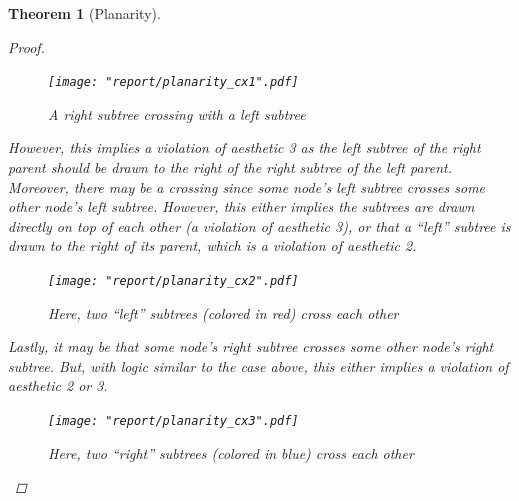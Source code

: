 \documentclass[11pt]{report}
\newtheorem{theorem}{Theorem}[section]
\begin{document}
\begin{theorem}[Planarity]
\begin{proof}
        \begin{figure}[H]
            \centering
            \texttt{[image: "report/planarity\_cx1".pdf]}
            \caption{A right subtree crossing with a left subtree}
        \end{figure}
        
        However, this implies a violation of aesthetic 3 as the left subtree of the right parent should be drawn to the right of the right subtree of the left parent. Moreover, there may be a crossing since some node's left subtree crosses some other node's left subtree. However, this either implies the subtrees are drawn directly on top of each other (a violation of aesthetic 3), or that a ``left'' subtree is drawn to the right of its parent, which is a violation of aesthetic 2.
        
        \begin{figure}[H]
            \centering
            \texttt{[image: "report/planarity\_cx2".pdf]}
            \caption{Here, two ``left'' subtrees (colored in red) cross each other}
        \end{figure}
        
        Lastly, it may be that some node's right subtree crosses some other node's right subtree. But, with logic similar to the case above, this either implies a violation of aesthetic 2 or 3.
        
        \begin{figure}[H]
            \centering
            \texttt{[image: "report/planarity\_cx3".pdf]}
            \caption{Here, two ``right'' subtrees (colored in blue) cross each other}
        \end{figure}
    \end{proof}
\end{theorem}
\end{document}

